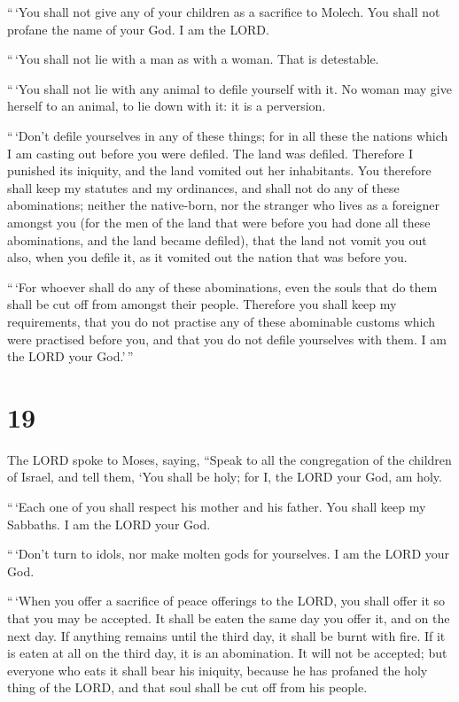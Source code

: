  ``\,`You shall not give any of your children as a
sacrifice to Molech. You shall not profane the name of your God. I am
the LORD.

 ``\,`You shall not lie with a man as with a woman. That is
detestable.

 ``\,`You shall not lie with any animal to defile yourself
with it. No woman may give herself to an animal, to lie down with it: it
is a perversion.

 ``\,`Don't defile yourselves in any of these things; for
in all these the nations which I am casting out before you were defiled.
 The land was defiled. Therefore I punished its iniquity,
and the land vomited out her inhabitants.  You therefore
shall keep my statutes and my ordinances, and shall not do any of these
abominations; neither the native-born, nor the stranger who lives as a
foreigner amongst you  (for the men of the land that were
before you had done all these abominations, and the land became
defiled),  that the land not vomit you out also, when you
defile it, as it vomited out the nation that was before you.

 ``\,`For whoever shall do any of these abominations, even
the souls that do them shall be cut off from amongst their people.
 Therefore you shall keep my requirements, that you do not
practise any of these abominable customs which were practised before
you, and that you do not defile yourselves with them. I am the LORD your
God.'\,''

\hypertarget{section-18}{%
\section{19}\label{section-18}}

 The LORD spoke to Moses, saying,  ``Speak to
all the congregation of the children of Israel, and tell them, `You
shall be holy; for I, the LORD your God, am holy.

 ``\,`Each one of you shall respect his mother and his
father. You shall keep my Sabbaths. I am the LORD your God.

 ``\,`Don't turn to idols, nor make molten gods for
yourselves. I am the LORD your God.

 ``\,`When you offer a sacrifice of peace offerings to the
LORD, you shall offer it so that you may be accepted.  It
shall be eaten the same day you offer it, and on the next day. If
anything remains until the third day, it shall be burnt with fire.
 If it is eaten at all on the third day, it is an
abomination. It will not be accepted;  but everyone who eats
it shall bear his iniquity, because he has profaned the holy thing of
the LORD, and that soul shall be cut off from his people.

